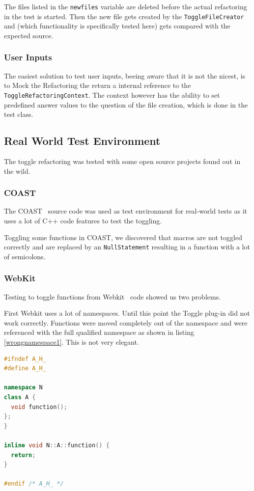 The files listed in the \texttt{newfiles} variable are deleted before the
actual refactoring in the test is started. Then the new file gets created by
the \texttt{ToggleFileCreator} and (which functionality is specifically tested
here) gets compared with the expected source.


\subsubsection{User Inputs}

The easiest solution to test user inputs, beeing aware that it is not the
nicest, is to Mock the Refactoring the return a internal reference to the
\texttt{ToggleRefactoringContext}. The context however has the ability to set
predefined answer values to the question of the file creation, which is done in
the test class.

\subsection{Real World Test Environment}

The toggle refactoring was tested with some open source projects found out in
the wild.

\subsubsection{COAST}
The COAST~\cite{COAST} source code was used as test environment for real-world 
tests as it uses a lot of C++ code features to test the toggling.

Toggling some functions in COAST, we discovered that macros are not toggled
correctly and are replaced by an \texttt{NullStatement} resulting in a function
with a lot of semicolons.

\subsubsection{WebKit}
Testing to toggle functions from Webkit~\cite{Webkit} code showed us two
problems.

First Webkit uses a lot of namespaces. Until this point the Toggle
plug-in did not work correctly. Functions were moved completely out of the
namespace and were referenced with the full qualified namespace as shown in
listing \ref{wrongnamespace1}. This is not very elegant.

\begin{lstlisting}[caption={\texttt{function()} with reference to namespace},
label={wrongnamespace1}, language=C++]
#ifndef A_H_
#define A_H_

namespace N
class A {
  void function();
};
}

inline void N::A::function() {
  return;
}

#endif /* A_H_ */
\end{lstlisting}

